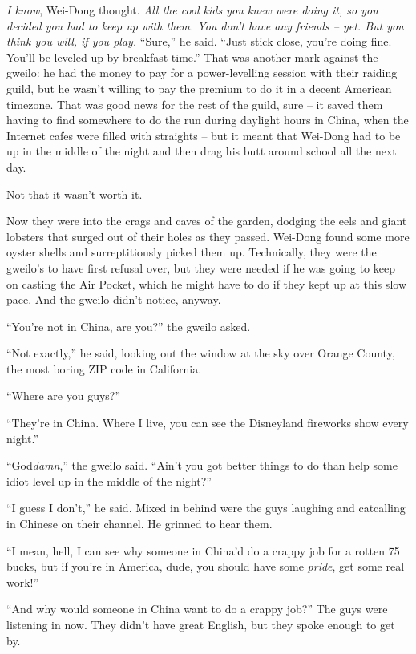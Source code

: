 \emph{I know}, Wei-Dong thought.
\emph{All the cool kids you knew were doing it, so you decided you had to keep up with them. You don't have any friends -- yet. But you think you will, if you play.}
``Sure,'' he said. ``Just stick close, you're doing fine. You'll be
leveled up by breakfast time.'' That was another mark against the
gweilo: he had the money to pay for a power-levelling session with
their raiding guild, but he wasn't willing to pay the premium to do
it in a decent American timezone. That was good news for the rest
of the guild, sure -- it saved them having to find somewhere to do
the run during daylight hours in China, when the Internet cafes
were filled with straights -- but it meant that Wei-Dong had to be
up in the middle of the night and then drag his butt around school
all the next day.

Not that it wasn't worth it.

Now they were into the crags and caves of the garden, dodging the
eels and giant lobsters that surged out of their holes as they
passed. Wei-Dong found some more oyster shells and surreptitiously
picked them up. Technically, they were the gweilo's to have first
refusal over, but they were needed if he was going to keep on
casting the Air Pocket, which he might have to do if they kept up
at this slow pace. And the gweilo didn't notice, anyway.

``You're not in China, are you?'' the gweilo asked.

``Not exactly,'' he said, looking out the window at the sky over
Orange County, the most boring ZIP code in California.

``Where are you guys?''

``They're in China. Where I live, you can see the Disneyland
fireworks show every night.''

``God\emph{damn},'' the gweilo said. ``Ain't you got better things to
do than help some idiot level up in the middle of the night?''

``I guess I don't,'' he said. Mixed in behind were the guys laughing
and catcalling in Chinese on their channel. He grinned to hear
them.

``I mean, hell, I can see why someone in China'd do a crappy job for
a rotten 75 bucks, but if you're in America, dude, you should have
some \emph{pride}, get some real work!''

``And why would someone in China want to do a crappy job?'' The guys
were listening in now. They didn't have great English, but they
spoke enough to get by.

